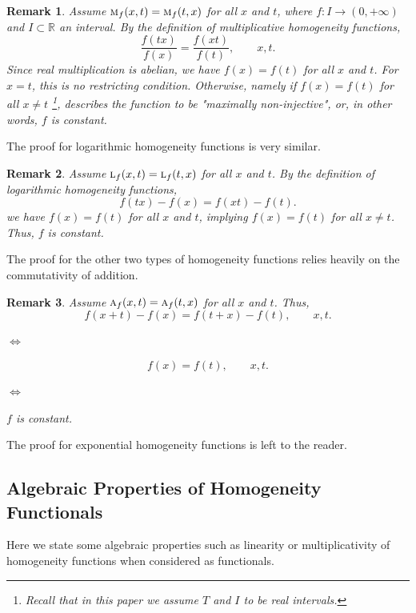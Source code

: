 \documentclass{amsart}
\theoremstyle{plain}
\newtheorem{remark}{Remark}
\numberwithin{equation}{section}
\newcommand{\R}{{\mathbb{R}}}
\begin{document}
\begin{remark}
Assume $\textsc{m}_f(x,t)= \textsc{m}_f(t,x)$ for all $x$ and $t$,
where $f: I \to (0, + \infty)$ and $I \subset \R$ an interval.
By the definition of multiplicative homogeneity functions,
\begin{equation*}
\frac{f(tx)}{f(x)}=
\frac{f(xt)}{f(t)}, \qquad x,t.
\end{equation*}
Since real multiplication is abelian,
we have $f(x)=f(t)$ for all $x$ and $t$.
For $x=t$, this is no restricting condition.
Otherwise, namely if $f(x)=f(t)$ for all $x \neq t$%
\footnote{Recall that in this paper we assume $T$ and $I$ to be real intervals. },
describes the function to be "maximally non-injective",
or, in other words, $f$ is constant.
\end{remark}

The proof for logarithmic homogeneity functions
is very similar.
\begin{remark}
Assume $\textsc{l}_f(x,t)= \textsc{l}_f(t,x)$ for all $x$ and $t$.
By the definition of logarithmic homogeneity functions,
\begin{equation*}
{f(tx)}-{f(x)}=
{f(xt)}-{f(t)}.
\end{equation*}
we have $f(x)=f(t)$ for all $x$ and $t$,
implying $f(x)=f(t)$ for all $x \neq t$.
Thus, $f$ is constant.
\end{remark}

The proof for the other two types of homogeneity functions
relies heavily on the commutativity of addition.
\begin{remark}
Assume $\textsc{a}_f(x,t)= \textsc{a}_f(t,x)$ for all $x$ and $t$.
Thus,
\begin{equation*}
{f(x+t)}-{f(x)}=
{f(t+x)}-{f(t)}, \qquad x,t.
\end{equation*}
\begin{center}
$\Leftrightarrow$
\end{center}
\begin{equation*}
{f(x)}={f(t)}, \qquad x,t.
\end{equation*}
\begin{center}
$\Leftrightarrow$
\end{center}

\begin{center}
$f$ is constant.
\end{center}
\end{remark}
The proof for exponential homogeneity functions is left to the reader.

\subsection{Algebraic Properties of Homogeneity Functionals}
\label{AlgProp}
Here we state some algebraic properties such as
linearity or multiplicativity
of homogeneity functions when considered as functionals.
\end{document}
